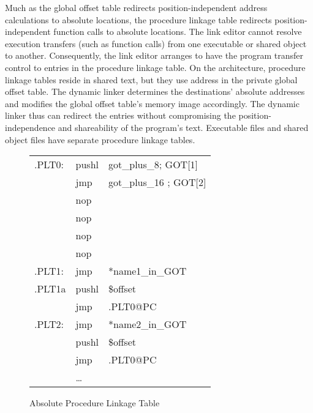 Much as the global offset table redirects position-independent address
calculations to absolute locations, the procedure linkage table
redirects position-independent function calls to absolute locations.
The link editor cannot resolve execution transfers (such as function
calls) from one executable or shared object to another.  Consequently,
the link editor arranges to have the program transfer control to
entries in the procedure linkage table.  On the \xARCH architecture,
procedure linkage tables reside in shared text, but they use address
in the private global offset table.  The dynamic linker determines the
destinations' absolute addresses and modifies the global offset
table's memory image accordingly.  The dynamic linker thus can
redirect the entries without compromising the position-independence
and shareability of the program's text.  Executable files and shared
object files have separate procedure linkage tables.


\begin{figure}[H]
\Hrule
\caption{Absolute Procedure Linkage Table}
\begin{center}
\begin{tabular}{|lll|}
\hline
.PLT0: & pushl & got\_plus\_8; GOT[1]\\
& jmp &got\_plus\_16 ; GOT[2] \\
& nop & \\
& nop & \\
& nop & \\
& nop & \\
.PLT1: & jmp & *name1\_in\_GOT\\
.PLT1a& pushl & \$offset \\
&jmp &.PLT0@PC \\
.PLT2: & jmp& *name2\_in\_GOT\\
&pushl & \$offset \\
& jmp & .PLT0@PC \\
&\dots&\\
\hline
\end{tabular}
\end{center}
\Hrule
\end{figure}


